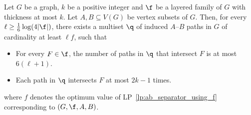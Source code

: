 \begin{theorem}\label{thm:ab_path_packing}
    Let $G$ be a graph, $k$ be a positive integer and $\f$ be a layered family of $G$ with thickness at most $k$. Let $A,B \subseteq V(G)$ be vertex subsets of $G$. 
    Then, for every $\ell \ge \frac{1}{6}\log(4|\f|)$, there exists a multiset $\q$ of induced $A$--$B$ paths in $G$ of cardinality at least $\ell f$, such that 
    \begin{itemize}
        \item For every $F \in \f$, the number of paths in $\q$ that intersect $F$ is at most $6(\ell+1)$.
        \item Each path in $\q$ intersects $F$ at most $2k-1$ times.
    \end{itemize}
    where $f$ denotes the optimum value of LP~\ref{lp:ab_separator_using_f} corresponding to $(G,\f,A,B)$.
\end{theorem}
